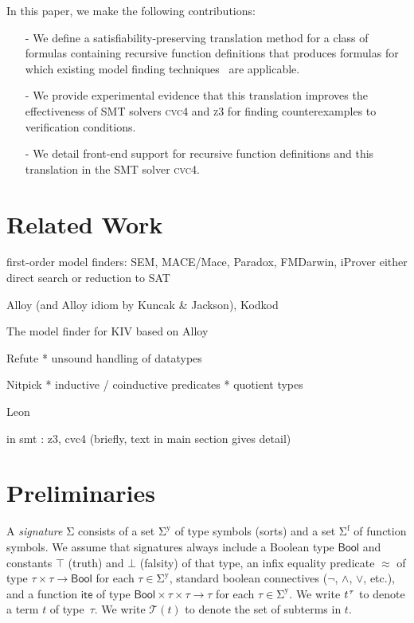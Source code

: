 \documentclass[runningheads,a4paper]{llncs}
\newcommand{\con}[1]{\mathsf{#1}}
\let\oldSigma=\Sigma
\def\Sigma{\mathrm{\oldSigma}}
\newcommand{\cvc}{\textsc{cvc}{\small 4}\xspace}
\newcommand{\ziii}{\textsc{z}{\small 3}\xspace}
\newcommand{\teq}{\approx}
\newcommand{\terms}{\mathcal{T}}
\newcommand{\ssorts}[1]{#1^\mathrm{y}}
\newcommand{\sfuns}[1]{#1^\mathrm{f}}
\newcommand{\sfundefs}[1]{#1^\mathrm{df}}
\newcommand{\Bool}{\con{Bool}}
\newcommand{\ltrue}{\top}
\newcommand{\lfalse}{\bot}
\newcommand{\lite}{\con{ite}}
\newcommand{\vthinspace}{\kern+0.083333em}
\newcommand{\typ}[1]{^{\vthinspace #1}}
\begin{document}
In this paper, we make the following contributions:
\begin{itemize}
\item[-] We define a satisfiability-preserving translation method for a class of formulas containing recursive function definitions
that produces formulas for which existing model finding techniques~\cite{GeDeM-CAV-09, ReyEtAl-1-RR-13} are applicable.
\item[-] We provide experimental evidence that this translation improves the effectiveness of SMT solvers \cvc and \ziii for finding counterexamples to verification conditions.
\item[-] We detail front-end support for recursive function definitions and this translation in the SMT solver \cvc.
\end{itemize}

\section{Related Work}

first-order model finders: SEM, MACE/Mace, Paradox, FMDarwin, iProver
  either direct search or reduction to SAT

Alloy (and Alloy idiom by Kuncak \& Jackson), Kodkod

The model finder for KIV based on Alloy

Refute
  * unsound handling of datatypes

Nitpick
  * inductive / coinductive predicates
  * quotient types

Leon

in smt : z3, cvc4 (briefly, text in main section gives detail)

\section{Preliminaries}
\label{sec:prelim}

A \emph{signature} $\Sigma$ consists of 
a set $\ssorts{\Sigma}$ of type symbols (sorts) and
a set $\sfuns{\Sigma}$ of function symbols.
We assume that signatures always include a Boolean type $\Bool$ and constants 
$\ltrue$ (truth) and $\lfalse$ (falsity) of that type,
an infix equality predicate $\teq$ of type $\tau \times \tau \to \Bool$
for each $\tau \in \ssorts{\Sigma}$,
standard boolean connectives ($\neg$, $\wedge$, $\vee$, etc.),
and a function $\lite$ of type $\Bool \times \tau \times \tau \rightarrow \tau$ for each $\tau \in \ssorts{\Sigma}$.
We write $t\typ{\tau}$ to denote a term $t$ of type~$\tau$.
We write $\terms( t )$ to denote the set of subterms in $t$.
\end{document}

